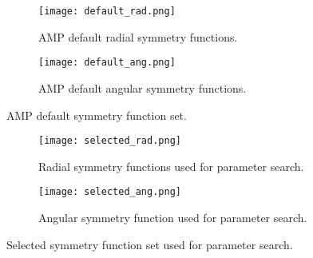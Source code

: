 \begin{figure}[H]
\begin{adjustbox}{max width=1.2\linewidth,center}
\centering
  \begin{subfigure}[b]{0.55\textwidth}
      \texttt{[image: default\_rad.png]}
      \caption{AMP default radial symmetry functions.}
    \label{fig:f1}
  \end{subfigure}
  \hfill
  \begin{subfigure}[b]{0.55\textwidth}
      \texttt{[image: default\_ang.png]}
      \caption{AMP default angular symmetry functions.}
    \label{fig:f2}
  \end{subfigure}
\end{adjustbox}
    \caption{AMP default symmetry function set.}
    \label{fig:default}
\end{figure}

\begin{figure}[H]
\begin{adjustbox}{max width=1.2\linewidth,center}
\centering
  \begin{subfigure}[b]{0.55\textwidth}
      \texttt{[image: selected\_rad.png]}
      \caption{Radial symmetry functions used for parameter search.}
    \label{fig:f1}
  \end{subfigure}
  \hfill
  \begin{subfigure}[b]{0.55\textwidth}
      \texttt{[image: selected\_ang.png]}
      \caption{Angular symmetry function used for parameter search.}
    \label{fig:f2}
  \end{subfigure}
\end{adjustbox}
    \caption{Selected symmetry function set used for parameter search.}
    \label{fig:selected}
\end{figure}

